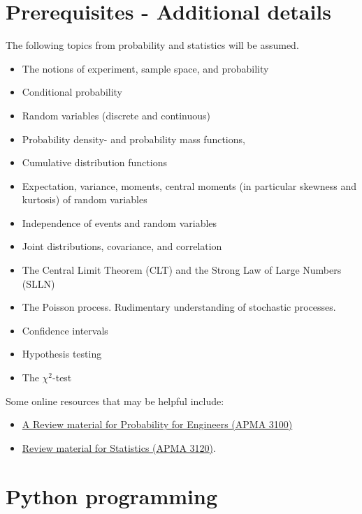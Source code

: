 \documentclass[11pt, a4paper]{article}
\begin{document}
\section{Prerequisites - Additional details}
\label{sec:prereq_list} 

The following topics from probability and statistics will be assumed. 

\begin{itemize}
\item The notions of experiment, sample space, and probability
\item Conditional probability
\item Random variables (discrete and continuous)
\item Probability density- and probability mass  functions,
\item Cumulative distribution functions
\item Expectation, variance, moments, central moments (in particular skewness and kurtosis) of random variables
\item Independence of events and random variables
\item Joint distributions, covariance, and correlation
\item The Central Limit Theorem (CLT) and the Strong Law of Large Numbers (SLLN)
\item The Poisson process. Rudimentary understanding of stochastic processes.
\item Confidence intervals
\item Hypothesis testing
\item The $\chi^2$-test
\end{itemize}

Some online resources that may be helpful include:
\begin{itemize}
\item \href{https://www.youtube.com/playlist?list=PL3nE1Yo1b4CpcEOgS3s80YUys7nGRqVPM}{A Review material for Probability for Engineers (APMA 3100)} 

\item \href{https://www.youtube.com/playlist?list=PL8dPuuaLjXtNM_Y-bUAhblSAdWRnmBUcr}{Review material for Statistics (APMA 3120)}.
\end{itemize}

\section{Python programming}
\label{sec:python_resources}
\end{document}
